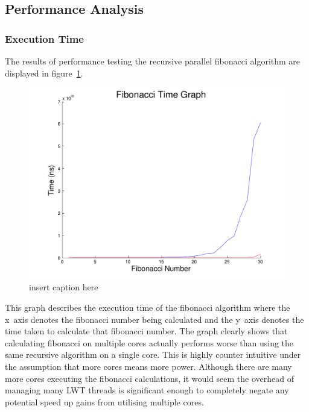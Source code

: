 \documentclass[12pt,twoside,notitlepage]{report}
\begin{document}
\subsection{Performance Analysis}
%
%
\subsubsection{Execution Time}
The results of performance testing the recursive parallel fibonacci algorithm are displayed in figure~\ref{fig:fib_time_graph}.
\begin{figure}[h!]
\includegraphics[width=\linewidth]{fib_time_graph}
\caption{insert caption here}
\label{fig:fib_time_graph}
\end{figure}
This graph describes the execution time of the fibonacci algorithm where the x~axis denotes the fibonacci number being calculated and the y~axis denotes the time taken to calculate that fibonacci number. The graph clearly shows that
calculating fibonacci on multiple cores actually performs worse than using the same recursive algorithm on a single core. This is highly counter intuitive under the assumption that more cores means more power. Although there are many
more cores executing the fibonacci calculations, it would seem the overhead of managing many LWT threads is significant enough to completely negate any potential speed up gains from utilising multiple cores.
\end{document}
